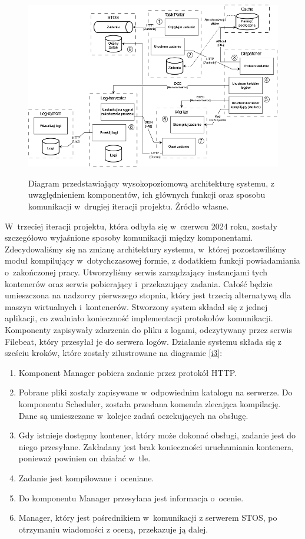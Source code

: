 \begin{figure}[!h]
	\begin{center}
		\resizebox{1.0\textwidth}{!} {
			\includegraphics{img/1/i2_arch.png}
		}
		\caption[Architektura po drugiej iteracji]{Diagram przedstawiający wysokopoziomową architekturę systemu, z uwzględnieniem komponentów, ich głównych funkcji oraz sposobu komunikacji w~drugiej iteracji projektu. Źródło własne.}
		\label{i2}
	\end{center}
\end{figure}
\newline \indent W~trzeciej iteracji projektu, która odbyła się w~czerwcu 2024 roku, zostały szczegółowo wyjaśnione sposoby komunikacji między komponentami. Zdecydowaliśmy się na zmianę architektury systemu, w~której pozostawiliśmy moduł kompilujący w~dotychczasowej formie, z dodatkiem funkcji powiadamiania o~zakończonej pracy. Utworzyliśmy serwis zarządzający instancjami tych kontenerów oraz serwis pobierający i~przekazujący zadania. Całość będzie umieszczona na nadzorcy pierwszego stopnia, który jest trzecią alternatywą dla maszyn wirtualnych i~kontenerów. Stworzony system składał się z jednej aplikacji, co zwalniało konieczność implementacji protokołów komunikacji. Komponenty zapisywały zdarzenia do pliku z logami, odczytywany przez serwis Filebeat, który przesyłał je do serwera logów. Działanie systemu składa się z sześciu kroków, które zostały zilustrowane na diagramie \ref{i3}:
\begin{enumerate}
	\item Komponent Manager pobiera zadanie przez protokół HTTP.
	\item Pobrane pliki zostały zapisywane w~odpowiednim katalogu na serwerze. Do komponentu Scheduler, została przesłana komenda zlecająca kompilację. Dane są umieszczane w~kolejce zadań oczekujących na obsługę.
	\item Gdy istnieje dostępny kontener, który może dokonać obsługi, zadanie jest do niego przesyłane. Zakładany jest brak konieczności uruchamiania kontenera, ponieważ powinien on działać w~tle.
	\item Zadanie jest kompilowane i~oceniane.
	\item Do komponentu Manager przesyłana jest informacja o~ocenie.
	\item Manager, który jest pośrednikiem w~komunikacji z serwerem STOS, po otrzymaniu wiadomości z oceną, przekazuje ją dalej.
\end{enumerate}
